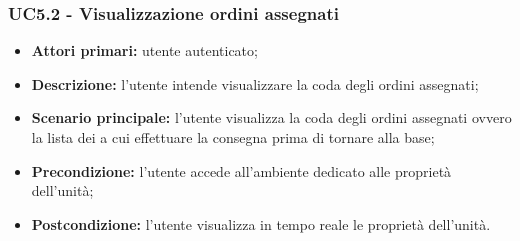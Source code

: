         \subsubsection{UC5.2 - Visualizzazione ordini assegnati}
        \begin{itemize}
            \item \textbf{Attori primari:} utente autenticato;
            \item \textbf{Descrizione:} l'utente intende visualizzare la coda degli ordini assegnati;
            \item \textbf{Scenario principale:} l'utente visualizza la coda degli ordini assegnati ovvero la lista dei  a cui effettuare la consegna prima di tornare alla base;
            \item \textbf{Precondizione:} l'utente accede all'ambiente dedicato alle proprietà dell'unità;
            \item \textbf{Postcondizione:} l'utente visualizza in tempo reale le proprietà dell'unità.
        \end{itemize}


